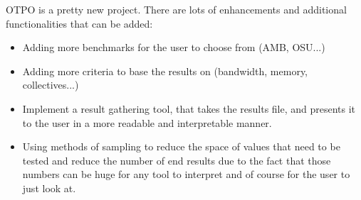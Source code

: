 OTPO is a pretty new project. There are lots of enhancements and additional
functionalities that can be added:
\begin{itemize}
\item Adding more benchmarks for the user to choose from (AMB, OSU...)
\item Adding more criteria to base the results on (bandwidth, memory,
  collectives...)
\item Implement a result gathering tool, that takes the results file, and
  presents it to the user in a more readable and interpretable manner.
\item Using methods of sampling to reduce the space of values that need to be
  tested and reduce the number of end results due to the fact that those
  numbers can be huge for any tool to interpret and of course for the user to
  just look at.
\end{itemize}
